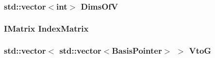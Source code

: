 \subsubsection{\setlength{\rightskip}{0pt plus 5cm}std::vector$<$int$>$ \bf{Dims\-Of\-V}}\label{basis_8h_8d39fd76366dc1dd8e6c4c076255c87f}


\subsubsection{\setlength{\rightskip}{0pt plus 5cm}\bf{IMatrix} \bf{Index\-Matrix}}\label{basis_8h_a3876e258afaecf57418f18355f5ea17}


\subsubsection{\setlength{\rightskip}{0pt plus 5cm}std::vector$<$ std::vector$<$\bf{Basis\-Pointer}$>$ $>$ \bf{Vto\-G}}\label{basis_8h_e21b844099197f70cbf20820b1ec46e8}


